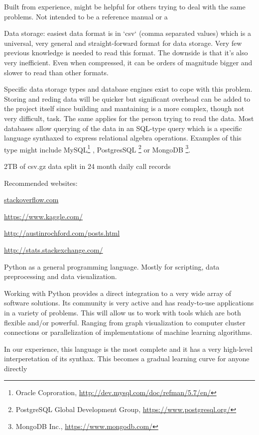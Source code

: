 \documentclass{article}%
\theoremstyle{definition}
\begin{document}
Built from experience, might be helpful for others trying to deal with the same problems. Not intended to be a reference manual or a 

Data storage: easiest data format is in `csv` (comma separated values) which is a universal, very general and straight-forward format for data storage. Very few previous knowledge is needed to read this format. The downside is that it's also very inefficient. Even when compressed, it can be orders of magnitude bigger and slower to read than other formats.

Specific data storage types and database engines exist to cope with this problem. Storing and reding data will be quicker but significant overhead can be added to the project itself since building and mantaining is a more complex, though not very difficult, task. The same applies for the person trying to read the data. Most databases allow querying of the data in an SQL-type query which is a specific language synthaxed to express relational algebra operations. Examples of this type might include MySQL\footnote{ Oracle Coproration, \url{http://dev.mysql.com/doc/refman/5.7/en/}} , PostgresSQL \footnote{ PostgreSQL Global Development Group, \url{https://www.postgresql.org/}} or MongoDB \footnote{ MongoDB Inc., \url{https://www.mongodb.com/}}.

2TB of csv.gz data split in 24 month daily call records

Recommended websites:

\url{stackoverflow.com}

\url{https://www.kaggle.com/} 

\url{http://austinrochford.com/posts.html}

\url{http://stats.stackexchange.com/}

Python as a general programming language. Mostly for scripting, data preprocessing and data visualization. 

Working with Python provides a direct integration to a very wide array of software solutions. Its community is very active and has ready-to-use applications in a variety of problems. This will allow us to work with tools which are both flexible and/or powerful. Ranging from graph visualization to computer cluster connections or parallelization of implementations of machine learning algorithms.

In our experience, this language is the most complete and it has a very high-level interperetation of its synthax. This becomes a gradual learning curve for anyone directly
\end{document}
